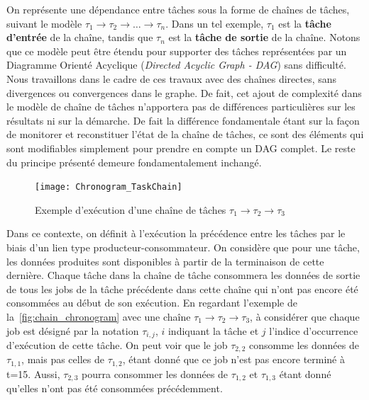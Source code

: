 \documentclass[french, a4paper, 11pt, twoside, pdftex]{StyleThese}
\begin{document}
	    
	    On représente une dépendance entre tâches sous la forme de chaînes de tâches, suivant le modèle $\tau_{1} \rightarrow \tau_2 \rightarrow \ldots \rightarrow \tau_n$. Dans un tel exemple, $\tau_1$ est la \textbf{tâche d'entrée} de la chaîne, tandis que $\tau_n$ est la \textbf{tâche de sortie} de la chaîne. Notons que ce modèle peut être étendu pour supporter des tâches représentées par un Diagramme Orienté Acyclique (\textit{Directed Acyclic Graph - DAG}) sans difficulté. Nous travaillons dans le cadre de ces travaux avec des chaînes directes, sans divergences ou convergences dans le graphe. De fait, cet ajout de complexité dans le modèle de chaîne de tâches n'apportera pas de différences particulières sur les résultats ni sur la démarche. De fait la différence fondamentale étant sur la façon de monitorer et reconstituer l'état de la chaîne de tâches, ce sont des éléments qui sont modifiables simplement pour prendre en compte un DAG complet. Le reste du principe présenté demeure fondamentalement inchangé.

	    \begin{figure}[ht]
	    	\centering
	    	\texttt{[image: Chronogram\_TaskChain]}
	    	\caption{Exemple d'exécution d'une chaîne de tâches $\tau_1 \rightarrow \tau_2 \rightarrow \tau_3$}
	    	\label{fig:chain_chronogram}
	    \end{figure}
    
	    Dans ce contexte, on définit à l'exécution la précédence entre les tâches par le biais d'un lien type producteur-consommateur. On considère que pour une tâche, les données produites sont disponibles à partir de la terminaison de cette dernière. Chaque tâche dans la chaîne de tâche consommera les données de sortie de tous les jobs de la tâche précédente dans cette chaîne qui n'ont pas encore été consommées au début de son exécution. En regardant l'exemple de la~\autoref{fig:chain_chronogram} avec une chaîne $\tau_1 \rightarrow \tau_2 \rightarrow \tau_3$, à considérer que chaque job est désigné par la notation $ \tau_{i,j} $, $i$ indiquant la tâche et $j$ l'indice d'occurrence d'exécution de cette tâche. On peut voir que le job $ \tau_{2,2} $ consomme les données de $ \tau_{1,1} $, mais pas celles de $ \tau_{1,2} $, étant donné que ce job n'est pas encore terminé à t=15. Aussi, $ \tau_{2,3} $ pourra consommer les données de $ \tau_{1,2} $ et $ \tau_{1,3} $ étant donné qu'elles n'ont pas été consommées précédemment.
	    
\end{document}
